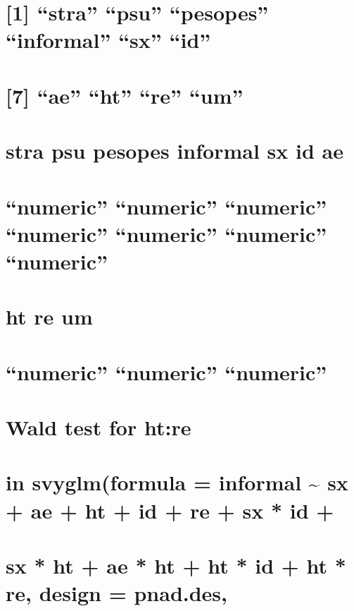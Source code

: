 \documentclass[]{book}
\theoremstyle{definition}
\theoremstyle{definition}
\theoremstyle{definition}
\theoremstyle{remark}
\begin{document}
\section{\texorpdfstring{{[}1{]} ``stra'' ``psu'' ``pesopes''
``informal'' ``sx''
``id''}{{[}1{]} stra psu pesopes informal sx id}}\label{stra-psu-pesopes-informal-sx-id}

\section{\texorpdfstring{{[}7{]} ``ae'' ``ht'' ``re''
``um''}{{[}7{]} ae ht re um}}\label{ae-ht-re-um}

\section{stra psu pesopes informal sx id
ae}\label{stra-psu-pesopes-informal-sx-id-ae}

\section{\texorpdfstring{``numeric'' ``numeric'' ``numeric'' ``numeric''
``numeric'' ``numeric''
``numeric''}{numeric numeric numeric numeric numeric numeric numeric}}\label{numeric-numeric-numeric-numeric-numeric-numeric-numeric}

\section{ht re um}\label{ht-re-um}

\section{\texorpdfstring{``numeric'' ``numeric''
``numeric''}{numeric numeric numeric}}\label{numeric-numeric-numeric}

\section{Wald test for ht:re}\label{wald-test-for-htre}

\section{in svyglm(formula = informal \textasciitilde{} sx + ae + ht +
id + re + sx * id
+}\label{in-svyglmformula-informal-sx-ae-ht-id-re-sx-id}

\section{sx * ht + ae * ht + ht * id + ht * re, design =
pnad.des,}\label{sx-ht-ae-ht-ht-id-ht-re-design-pnad.des}
\end{document}
